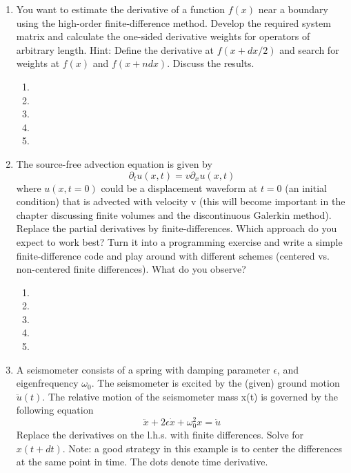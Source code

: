 \begin{enumerate}
\begin{enumerate}
\item[]
\item[] 
\end{enumerate}
\item
You want to estimate the derivative of a function $f(x)$ near a boundary using the high-order finite-difference method. Develop the required system matrix and calculate the one-sided derivative weights for operators of arbitrary length. Hint: Define the derivative at $f(x+dx/2)$ and search for weights at $f(x)$ and $f(x+n dx)$. Discuss the results. 
\begin{enumerate}
\item[]
\item[]
\item[] 
\item[]
\item[] 
\end{enumerate}
\item 
The source-free advection equation is given by 
\begin{displaymath}
\partial_t u(x,t) =  v \partial_x u(x,t) 
\end{displaymath}
where $u(x,t=0)$ could be a displacement waveform at $t=0$ (an initial condition) that is advected with velocity v (this will become important in the chapter discussing finite volumes and the discontinuous Galerkin method). Replace the partial derivatives by finite-differences. Which approach do you expect to work best? Turn it into a programming exercise and write a simple finite-difference code and play around with different schemes (centered vs. non-centered finite differences). What do you observe? 
\begin{enumerate}
\item[]
\item[]
\item[] 
\item[]
\item[] 
\end{enumerate}
\item
A seismometer consists of a spring with damping parameter $\epsilon$, and eigenfrequency $\omega_0$. The seismometer is excited by the (given) ground motion $\ddot{u}(t)$. The relative motion of the seismometer mass x(t) is governed by the following equation
\begin{displaymath}
\ddot{x}+2\epsilon \dot{x} + \omega^2_0 x = \ddot{u}
\end{displaymath}
Replace the derivatives on the l.h.s. with finite differences. Solve for $x(t+dt)$. Note: a good strategy in this example is to center the differences at the same point in time.  The dots denote time derivative. 

\end{enumerate}
